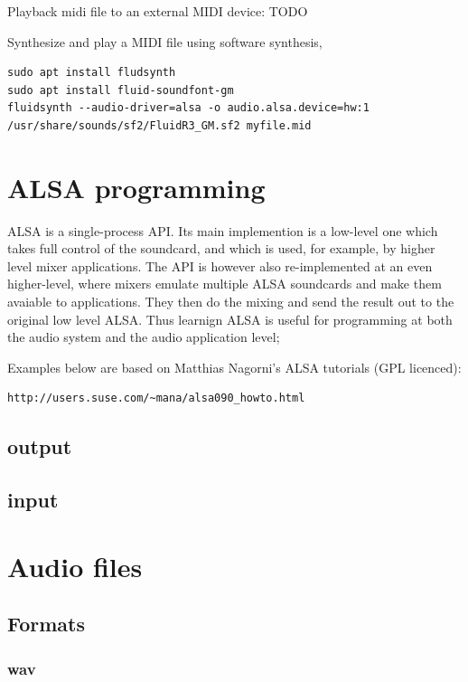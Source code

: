 \documentclass[oneside,english]{scrbook}
\begin{document}
Playback midi file to an external MIDI device:
TODO


Synthesize and play a MIDI file using software synthesis,
\begin{lstlisting}
sudo apt install fludsynth
sudo apt install fluid-soundfont-gm
fluidsynth --audio-driver=alsa -o audio.alsa.device=hw:1 /usr/share/sounds/sf2/FluidR3_GM.sf2 myfile.mid
\end{lstlisting}




\chapter{ALSA programming}

ALSA is a single-process API.  Its main implemention is a low-level one which takes full control of the soundcard, and which is used, for example, by higher level mixer applications.  The API is however also re-implemented at an even higher-level, where mixers emulate multiple ALSA soundcards and make them avaiable to applications.  They then do the mixing and send the result out to the original low level ALSA.  Thus learnign ALSA is useful for programming at both the audio system and the audio application level;

Examples below are based on Matthias Nagorni's ALSA tutorials (GPL licenced):
\begin{lstlisting}
http://users.suse.com/~mana/alsa090_howto.html
\end{lstlisting}

\section{output}


\section{input}

\chapter{Audio files}

\section{Formats}
\subsection{wav}
\end{document}
